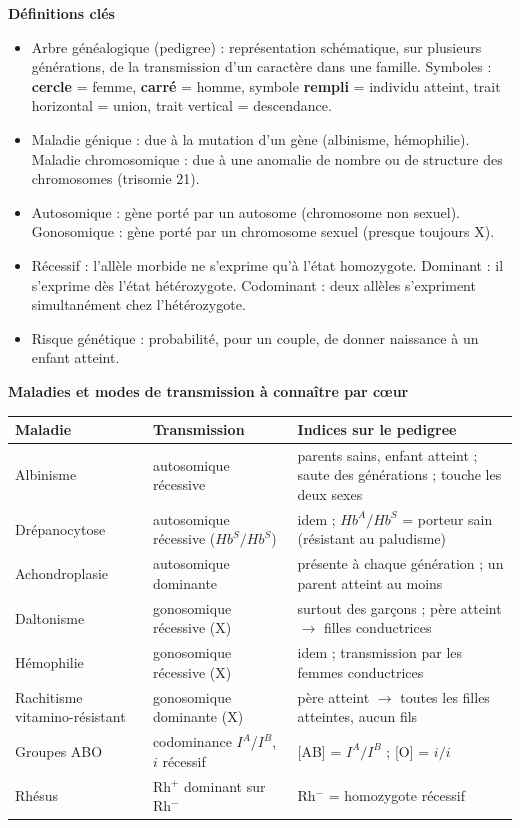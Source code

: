 \documentclass[11pt]{article}
\newcommand{\cle}[1]{{\popxbold\color{popdark}#1}}
\begin{document}
\begin{bilan}
\textbf{Définitions clés}
\begin{itemize}
  \item \cle{Arbre généalogique} (pedigree) : représentation schématique, sur plusieurs générations, de la transmission d'un caractère dans une famille. Symboles : \textbf{cercle} = femme, \textbf{carré} = homme, symbole \textbf{rempli} = individu atteint, trait horizontal = union, trait vertical = descendance.
  \item \cle{Maladie génique} : due à la mutation d'un gène (albinisme, hémophilie). \cle{Maladie chromosomique} : due à une anomalie de nombre ou de structure des chromosomes (trisomie 21).
  \item \cle{Autosomique} : gène porté par un autosome (chromosome non sexuel). \cle{Gonosomique} : gène porté par un chromosome sexuel (presque toujours X).
  \item \cle{Récessif} : l'allèle morbide ne s'exprime qu'à l'état homozygote. \cle{Dominant} : il s'exprime dès l'état hétérozygote. \cle{Codominant} : deux allèles s'expriment simultanément chez l'hétérozygote.
  \item \cle{Risque génétique} : probabilité, pour un couple, de donner naissance à un enfant atteint.
\end{itemize}

\textbf{Maladies et modes de transmission à connaître par cœur}
\begin{center}
\begin{tabularx}{\linewidth}{|l|X|X|}\hline
\rowcolor{popblueL} \textbf{Maladie} & \textbf{Transmission} & \textbf{Indices sur le pedigree} \\ \hline
Albinisme & autosomique récessive & parents sains, enfant atteint ; saute des générations ; touche les deux sexes \\ \hline
Drépanocytose & autosomique récessive ($Hb^S/Hb^S$) & idem ; $Hb^A/Hb^S$ = porteur sain (résistant au paludisme) \\ \hline
Achondroplasie & autosomique dominante & présente à chaque génération ; un parent atteint au moins \\ \hline
Daltonisme & gonosomique récessive (X) & surtout des garçons ; père atteint $\to$ filles conductrices \\ \hline
Hémophilie & gonosomique récessive (X) & idem ; transmission par les femmes conductrices \\ \hline
Rachitisme vitamino-résistant & gonosomique dominante (X) & père atteint $\to$ toutes les filles atteintes, aucun fils \\ \hline
Groupes ABO & codominance $I^A$/$I^B$, $i$ récessif & [AB] = $I^A/I^B$ ; [O] = $i/i$ \\ \hline
Rhésus & Rh$^+$ dominant sur Rh$^-$ & Rh$^-$ = homozygote récessif \\ \hline
\end{tabularx}
\end{center}


\end{bilan}
\end{document}
